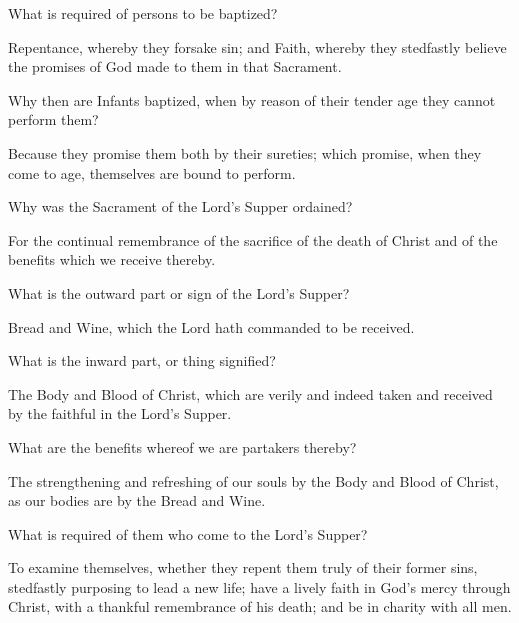  What is required of persons to be baptized?

 Repentance, whereby they forsake sin; and Faith, whereby they stedfastly believe the promises of God made to them in that Sacrament.

 Why then are Infants baptized, when by reason of their tender age they cannot perform them?

 Because they promise them both by their sureties; which promise, when they come to age, themselves are bound to perform.

 Why was the Sacrament of the Lord's Supper ordained?

 For the continual remembrance of the sacrifice of the death of Christ and of the benefits which we receive thereby.


 What is the outward part or sign of the Lord's Supper?


 Bread and Wine, which the Lord hath commanded to be received.


 What is the inward part, or thing signified?

 The Body and Blood of Christ, which are verily and indeed taken and received by the faithful in the Lord's Supper.

 What are the benefits whereof we are partakers thereby?

 The strengthening and refreshing of our souls by the Body and Blood of Christ, as our bodies are by the Bread and Wine.

 What is required of them who come to the Lord's Supper?

 To examine themselves, whether they repent them truly of their former sins, stedfastly purposing to lead a new life; have a lively faith in God's mercy through Christ, with a thankful remembrance of his death; and be in charity with all men.



